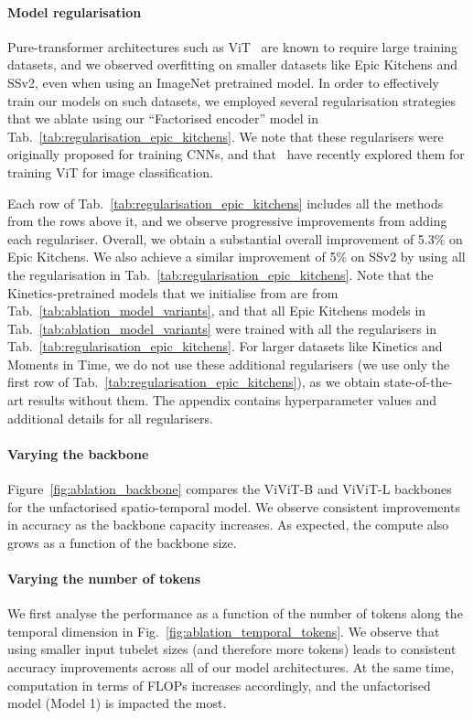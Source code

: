 \paragraph{Model regularisation}
Pure-transformer architectures such as ViT~\cite{dosovitskiy_iclr_2021} are known to require large training datasets, and we observed overfitting on smaller datasets like Epic Kitchens and SSv2, even when using an ImageNet pretrained model.
In order to effectively train our models on such datasets, we employed several regularisation strategies that we ablate using our ``Factorised encoder'' model in Tab.~\ref{tab:regularisation_epic_kitchens}.
We note that these regularisers were originally proposed for training CNNs, and that~\cite{touvron_arxiv_2020} have recently explored them for training ViT for image classification.

Each row of Tab.~\ref{tab:regularisation_epic_kitchens} includes all the methods from the rows above it, and we observe progressive improvements from adding each regulariser.
Overall, we obtain a substantial overall improvement of 5.3\% on Epic Kitchens. %
We also achieve a similar improvement of 5\% %
on SSv2 by using all the regularisation in Tab.~\ref{tab:regularisation_epic_kitchens}.
Note that the Kinetics-pretrained models that we initialise from are from Tab.~\ref{tab:ablation_model_variants}, and that all Epic Kitchens models in Tab.~\ref{tab:ablation_model_variants} were trained with all the regularisers in Tab.~\ref{tab:regularisation_epic_kitchens}.
For larger datasets like Kinetics and Moments in Time, we do not use these additional regularisers (we use only the first row of Tab.~\ref{tab:regularisation_epic_kitchens}), as we obtain state-of-the-art results without them.
The appendix contains hyperparameter values and additional details for all regularisers.


\paragraph{Varying the backbone}
Figure~\ref{fig:ablation_backbone} compares the ViViT-B and ViViT-L backbones for the unfactorised spatio-temporal model. We observe consistent improvements in accuracy as the backbone capacity increases. As expected, the compute also grows as a function of the backbone size.



\paragraph{Varying the number of tokens}
We first analyse the performance as a function of the number of tokens along the temporal dimension %
in Fig.~\ref{fig:ablation_temporal_tokens}. 
We observe that using smaller input tubelet sizes (and therefore more tokens) leads to consistent accuracy improvements across all of our model architectures.
At the same time, computation in terms of FLOPs increases accordingly, and the unfactorised model (Model 1) is impacted the most.

